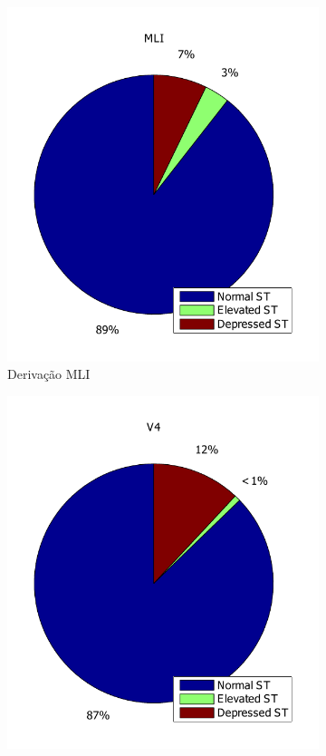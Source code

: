 \begin{figure}[ht]
    \centering
    \begin{subfigure}[b]{.4\textwidth}
        \includegraphics[width=\textwidth]{figures/chap6-mli-st-class-dist.pdf}
        \caption{Derivação MLI}
        \label{fig:mlistclass}
    \end{subfigure}
    \begin{subfigure}[b]{.4\textwidth}
        \includegraphics[width=\textwidth]{figures/chap6-v4-st-class-dist.pdf}

\end{subfigure}
\end{figure}
